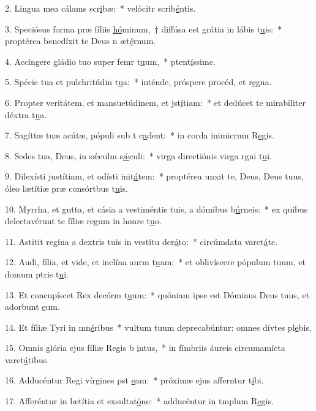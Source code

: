 2. Lingua mea cálams scr\uline{i}bæ:~* velócitr scrib\uline{é}ntis.\par 
3. Speciósus forma præ fíliis \uline{hó}minum,~† diffúsa est grátia in lábis t\uline{u}is:~* proptérea benedíxit te Deus n æt\uline{é}rnum.\par 
4. Accíngere gládio tuo super femr t\uline{u}um,~* ptent\uline{í}ssime.\par 
5. Spécie tua et pulchritúdin t\uline{u}a:~* inténde, próspere procéd, et r\uline{e}gna.\par 
6. Propter veritátem, et mansuetúdinem, et jst\uline{í}tiam:~* et dedúcet te mirabíliter déxtra t\uline{u}a.\par 
7. Sagíttæ tuæ acútæ, pópuli sub t c\uline{a}dent:~* in corda inimicrum R\uline{e}gis.\par 
8. Sedes tua, Deus, in sǽculm s\uline{ǽ}culi:~* virga directiónis virga rgni t\uline{u}i.\par 
9. Dilexísti justítiam, et odísti init\uline{á}tem:~* proptérea unxit te, Deus, Deus tuus, óleo lætítiæ præ consórtbus t\uline{u}is.\par 
10. Myrrha, et gutta, et cásia a vestiméntis tuis, a dómibus b\uline{ú}rneis:~* ex quibus delectavérunt te fíliæ regum in honre t\uline{u}o.\par 
11. Astitit regína a dextris tuis in vestítu der\uline{á}to:~* circúmdata varet\uline{á}te.\par 
12. Audi, fília, et vide, et inclína aurm t\uline{u}am:~* et oblivíscere pópulum tuum, et domum ptris t\uline{u}i.\par 
13. Et concupíscet Rex decórm t\uline{u}um:~* quóniam ipse est Dóminus Deus tuus, et adorbunt \uline{e}um.\par 
14. Et fíliæ Tyri in mn\uline{é}ribus~* vultum tuum deprecabúntur: omnes dívtes pl\uline{e}bis.\par 
15. Omnis glória ejus fíliæ Regis b \uline{i}ntus,~* in fímbriis áureis circumamícta varet\uline{á}tibus.\par 
16. Adducéntur Regi vírgines pst \uline{e}am:~* próximæ ejus afferntur t\uline{i}bi.\par 
17. Afferéntur in lætítia et exsultat\uline{ó}ne:~* adducéntur in tmplum R\uline{e}gis.\par 
